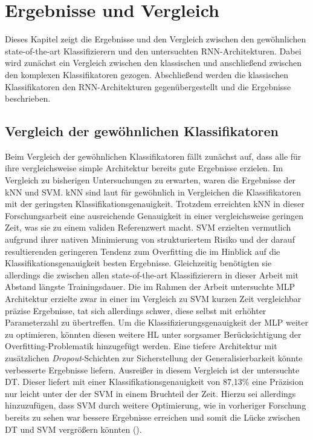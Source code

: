\chapter{Ergebnisse und Vergleich}
\label{chap:results}

Dieses Kapitel zeigt die Ergebnisse und den Vergleich zwischen den gewöhnlichen state-of-the-art Klassifizierern und den untersuchten RNN-Architekturen. Dabei wird zunächst ein Vergleich zwischen den klassischen und anschließend zwischen den komplexen Klassifikatoren gezogen. Abschließend werden die klassischen Klassifikatoren den RNN-Architekturen gegenübergestellt und die Ergebnisse beschrieben.

\section{Vergleich der gewöhnlichen Klassifikatoren}
\label{sec:other-classifiers-comp}

Beim Vergleich der gewöhnlichen Klassifikatoren fällt zunächst auf, dass alle für ihre vergleichsweise simple Architektur bereits gute Ergebnisse erzielen. Im Vergleich zu bisherigen Untersuchungen zu erwarten, waren die Ergebnisse der kNN und SVM. kNN sind laut \cite{Kaufmann2013} für gewöhnlich in Vergleichen die Klassifikatoren mit der geringsten Klassifikationsgenauigkeit. Trotzdem erreichten kNN in dieser Forschungsarbeit eine ausreichende Genauigkeit in einer vergleichsweise geringen Zeit, was sie zu einem validen Referenzwert macht. SVM erzielten vermutlich aufgrund ihrer nativen Minimierung von strukturiertem Risiko und der darauf resultierenden geringeren Tendenz zum Overfitting die im Hinblick auf die Klassifikationsgenauigkeit besten Ergebnisse. Gleichzeitig benötigten sie allerdings die zwischen allen state-of-the-art Klassifizierern in dieser Arbeit mit Abstand längste Trainingsdauer. Die im Rahmen der Arbeit untersuchte MLP Architektur erzielte zwar in einer im Vergleich zu SVM kurzen Zeit vergleichbar präzise Ergebnisse, tat sich allerdings schwer, diese selbst mit erhöhter Parameterzahl zu übertreffen. Um die Klassifizierungsgenauigkeit der MLP weiter zu optimieren, könnten diesen weitere HL unter sorgsamer Berücksichtigung der Overfitting-Problematik hinzugefügt werden. Eine tiefere Architektur mit zusätzlichen \textit{Dropout}-Schichten zur Sicherstellung der Generalisierbarkeit könnte verbesserte Ergebnisse liefern. Ausreißer in diesem Vergleich ist der untersuchte DT. Dieser liefert mit einer Klassifikationsgenauigkeit von 87,13\% eine Präzision nur leicht unter der der SVM in einem Bruchteil der Zeit. Hierzu sei allerdings hinzuzufügen, dass SVM durch weitere Optimierung, wie in vorheriger Forschung bereits zu sehen war bessere Ergebnisse erreichen und somit die Lücke zwischen DT und SVM vergrößern könnten (\cite{Kaufmann2013}). 

